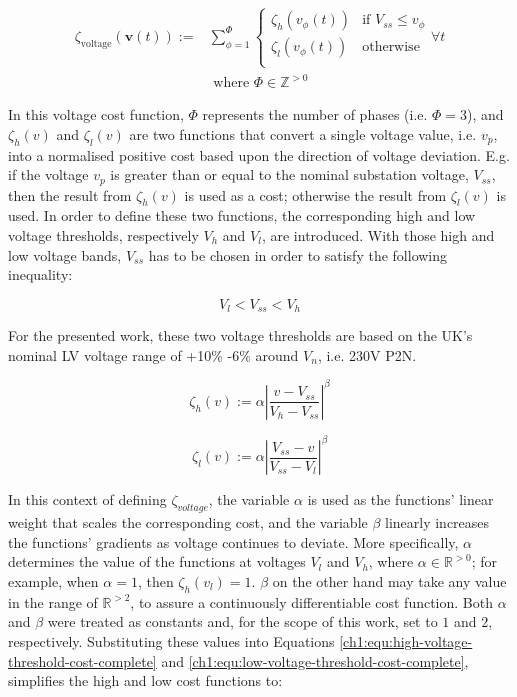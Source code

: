 \begin{equation}
\begin{split}
	\zeta_\text{voltage}(\textbf{v}(t)) :=& \sum_{\phi=1}^{\Phi}{\begin{cases}
		\zeta_h(v_{\phi}(t)) & \text{if } V_{ss} \leq v_\phi\\
		\zeta_l(v_{\phi}(t)) & \text{otherwise}\\
	\end{cases}} \forall t\\
	&\text{ where } \Phi \in \mathbb{Z}^{>0}
\end{split}
\label{ch1:equ:voltage-deviation}
\end{equation}

In this voltage cost function, $\Phi$ represents the number of phases (i.e. $\Phi = 3$), and $\zeta_h(v)$ and $\zeta_l(v)$ are two functions that convert a single voltage value, i.e. $v_p$, into a normalised positive cost based upon the direction of voltage deviation.
E.g. if the voltage $v_p$ is greater than or equal to the nominal substation voltage, $V_{ss}$, then the result from $\zeta_h(v)$ is used as a cost; otherwise the result from $\zeta_l(v)$ is used.
In order to define these two functions, the corresponding high and low voltage thresholds, respectively $V_h$ and $V_l$, are introduced.
With those high and low voltage bands, $V_{ss}$ has to be chosen in order to satisfy the following inequality:

\begin{equation}
	V_l < V_{ss} < V_h
\end{equation}

For the presented work, these two voltage thresholds are based on the UK's nominal LV voltage range of +10\% -6\% around $V_n$, i.e. 230V P2N.

\begin{equation}
	\zeta_h(v) := \alpha \left|\frac{v-V_{ss}}{V_h-V_{ss}}\right|^{\beta}
	\label{ch1:equ:high-voltage-threshold-cost-complete}
\end{equation}

\begin{equation}
	\zeta_l(v) := \alpha \left|\frac{V_{ss}-v}{V_{ss}-V_l}\right|^{\beta}
	\label{ch1:equ:low-voltage-threshold-cost-complete}
\end{equation}

In this context of defining $\zeta_{voltage}$, the variable $\alpha$ is used as the functions' linear weight that scales the corresponding cost, and the variable $\beta$ linearly increases the functions' gradients as voltage continues to deviate.
More specifically, $\alpha$ determines the value of the functions at voltages $V_l$ and $V_h$, where $\alpha \in \mathbb{R}^{>0}$; for example, when $\alpha = 1$, then $\zeta_{h}(v_l) = 1$.
$\beta$ on the other hand may take any value in the range of $\mathbb{R}^{>2}$, to assure a continuously differentiable cost function.
Both $\alpha$ and $\beta$ were treated as constants and, for the scope of this work, set to $1$ and $2$, respectively.
Substituting these values into Equations \ref{ch1:equ:high-voltage-threshold-cost-complete} and \ref{ch1:equ:low-voltage-threshold-cost-complete}, simplifies the high and low cost functions to:

